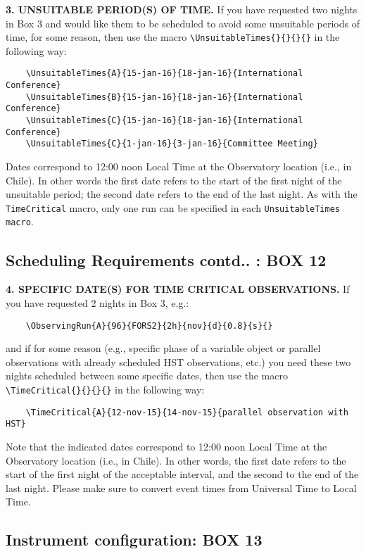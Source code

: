 \documentclass{article}
\begin{document}
\medskip

{\bf 3. UNSUITABLE PERIOD(S) OF TIME.}  If you have requested two
nights in Box 3 and would like them to be scheduled to avoid some
unsuitable periods of time, for some reason, then use the macro
\verb|\UnsuitableTimes{}{}{}{}| in the following way:
\begin{verbatim}
    \UnsuitableTimes{A}{15-jan-16}{18-jan-16}{International Conference}
    \UnsuitableTimes{B}{15-jan-16}{18-jan-16}{International Conference}
    \UnsuitableTimes{C}{15-jan-16}{18-jan-16}{International Conference}
    \UnsuitableTimes{C}{1-jan-16}{3-jan-16}{Committee Meeting}
\end{verbatim}

Dates correspond to 12:00 noon Local Time at
the Observatory location (i.e., in Chile).
In other words the first date refers to the start of the first night
of the unsuitable period; the second date refers to the end of the last night.
As with the \verb|TimeCritical| macro, only one run can be specified in each
\verb|UnsuitableTimes macro|.

\subsection{Scheduling Requirements contd.. : {\bf BOX 12}}
\label{sec:timecrit}

{\bf 4. SPECIFIC DATE(S) FOR TIME CRITICAL  OBSERVATIONS.} If you have 
requested 2 nights in Box 3, e.g.:
\begin{verbatim}
    \ObservingRun{A}{96}{FORS2}{2h}{nov}{d}{0.8}{s}{} 
\end{verbatim}
and if for some reason (e.g., specific phase of a variable object
or parallel observations with already scheduled HST observations,
etc.)  you need these two nights scheduled between some specific
dates, then use the macro \verb|\TimeCritical{}{}{}{}| in the
following way:
\begin{verbatim}
    \TimeCritical{A}{12-nov-15}{14-nov-15}{parallel observation with HST}
\end{verbatim}
Note that the indicated dates correspond to 12:00 noon Local Time at
the Observatory location (i.e., in Chile). In other words, the first
date refers to the start of the first night of the acceptable
interval, and the second to the end of the last night. Please make
sure to convert event times from Universal Time to Local Time.

\subsection{Instrument configuration: {\bf BOX 13}}
\end{document}

